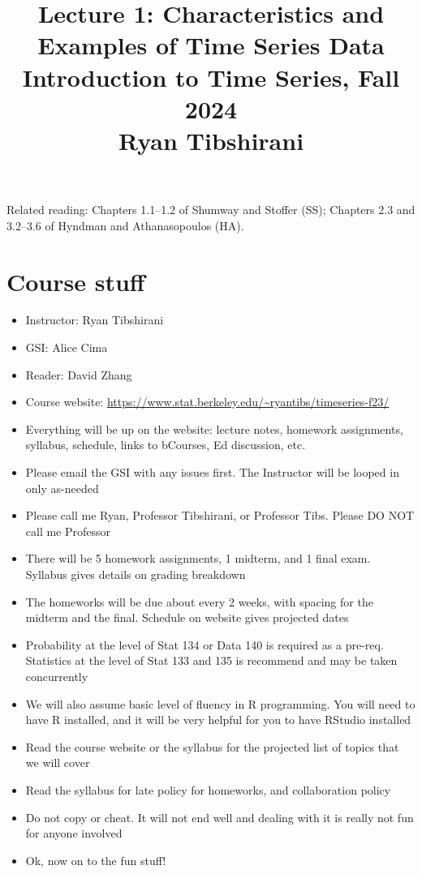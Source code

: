 \documentclass{article}
\title{Lecture 1: Characteristics and Examples of Time Series Data \\ \smallskip  
\large Introduction to Time Series, Fall 2024 \\ \smallskip
Ryan Tibshirani}
\date{}
\begin{document}
\maketitle
\RaggedRight
\vspace{-50pt}

Related reading: Chapters 1.1--1.2 of Shumway and Stoffer (SS); Chapters 2.3 and   
3.2--3.6 of Hyndman and Athanasopoulos (HA). 

\section{Course stuff}

\begin{itemize}
\item Instructor: Ryan Tibshirani
\item GSI: Alice Cima
\item Reader: David Zhang
\item Course website:
  \url{https://www.stat.berkeley.edu/~ryantibs/timeseries-f23/}

\item Everything will be up on the website: lecture notes, homework assignments,
  syllabus, schedule, links to bCourses, Ed discussion, etc.

\item Please email the GSI with any issues first. The Instructor will be looped
  in only as-needed 

\item Please call me Ryan, Professor Tibshirani, or Professor Tibs. Please DO
  NOT call me Professor 

\item There will be 5 homework assignments, 1 midterm, and 1 final
  exam. Syllabus gives details on grading breakdown

\item The homeworks will be due about every 2 weeks, with spacing for the
  midterm and the final. Schedule on website gives projected dates

\item Probability at the level of Stat 134 or Data 140 is required as a
  pre-req. Statistics at the level of Stat 133 and 135 is recommend and may be
  taken concurrently

\item We will also assume basic level of fluency in R programming. You will need
  to have R installed, and it will be very helpful for you to have RStudio
  installed 

\item Read the course website or the syllabus for the projected list of topics
  that we will cover

\item Read the syllabus for late policy for homeworks, and collaboration policy 

\item Do not copy or cheat. It will not end well and dealing with it is really
  not fun for anyone involved

\item Ok, now on to the fun stuff!
\end{itemize}
\end{document}

